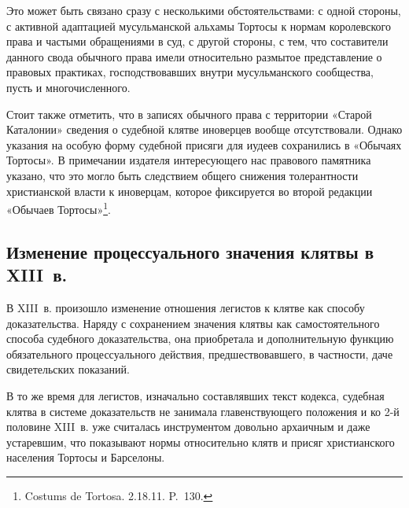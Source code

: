 Это может быть связано сразу с несколькими обстоятельствами: с одной стороны, с активной адаптацией мусульманской альхамы Тортосы к нормам королевского права и частыми обращениями в суд, с другой стороны, с тем, что составители данного свода обычного права имели относительно размытое представление о правовых практиках, господствовавших внутри мусульманского сообщества, пусть и многочисленного.

Стоит также отметить, что в записях обычного права с территории «Старой Каталонии» сведения о судебной клятве иноверцев вообще отсутствовали. Однако указания на особую форму судебной присяги для иудеев сохранились в «Обычаях Тортосы». В примечании издателя интересующего нас правового памятника указано, что это могло быть следствием общего снижения толерантности христианской власти к иноверцам, которое фиксируется во второй редакции «Обычаев Тортосы»\footnote{Costums de Tortosa. 2.18.11. P.~130.}.

\subsection{Изменение процессуального значения клятвы в XIII~в.}

В XIII~в. произошло изменение отношения легистов к клятве как способу доказательства. Наряду с сохранением значения клятвы как самостоятельного способа судебного доказательства, она приобретала и дополнительную функцию обязательного процессуального действия, предшествовавшего, в частности, даче свидетельских показаний.

В то же время для легистов, изначально составлявших текст кодекса, судебная клятва в системе доказательств не занимала главенствующего положения и ко 2-й половине XIII~в. уже считалась инструментом довольно архаичным и даже устаревшим, что показывают нормы относительно клятв и присяг христианского населения Тортосы и Барселоны.

